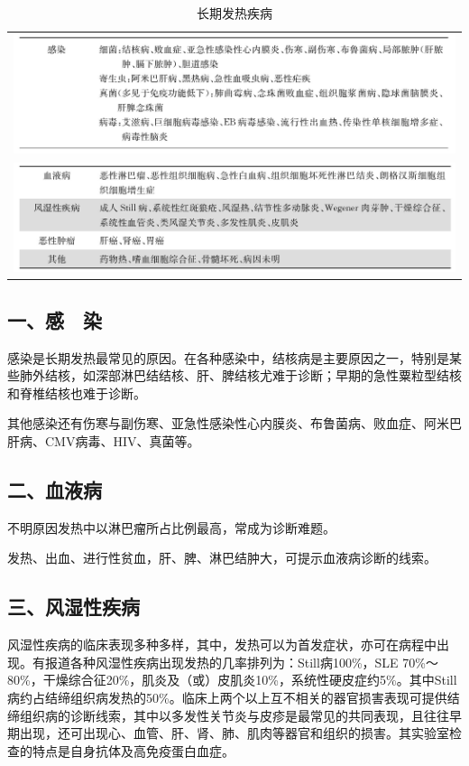 \begin{longtable}{c}
 \caption{长期发热疾病}
 \label{tab2-14}
 \endfirsthead
 \caption[]{长期发热疾病}
 \endhead
 \includegraphics[width=\textwidth,height=\textheight,keepaspectratio]{./images/Image00019.jpg}\\
 \includegraphics[width=\textwidth,height=\textheight,keepaspectratio]{./images/Image00020.jpg}
 \end{longtable}

\subsection{一、感　染}

感染是长期发热最常见的原因。在各种感染中，结核病是主要原因之一，特别是某些肺外结核，如深部淋巴结结核、肝、脾结核尤难于诊断；早期的急性粟粒型结核和脊椎结核也难于诊断。

其他感染还有伤寒与副伤寒、亚急性感染性心内膜炎、布鲁菌病、败血症、阿米巴肝病、CMV病毒、HIV、真菌等。

\subsection{二、血液病}

不明原因发热中以淋巴瘤所占比例最高，常成为诊断难题。

发热、出血、进行性贫血，肝、脾、淋巴结肿大，可提示血液病诊断的线索。

\subsection{三、风湿性疾病}

风湿性疾病的临床表现多种多样，其中，发热可以为首发症状，亦可在病程中出现。有报道各种风湿性疾病出现发热的几率排列为：Still病100\%，SLE
70\%～80\%，干燥综合征20\%，肌炎及（或）皮肌炎10\%，系统性硬皮症约5\%。其中Still病约占结缔组织病发热的50\%。临床上两个以上互不相关的器官损害表现可提供结缔组织病的诊断线索，其中以多发性关节炎与皮疹是最常见的共同表现，且往往早期出现，还可出现心、血管、肝、肾、肺、肌肉等器官和组织的损害。其实验室检查的特点是自身抗体及高免疫蛋白血症。


